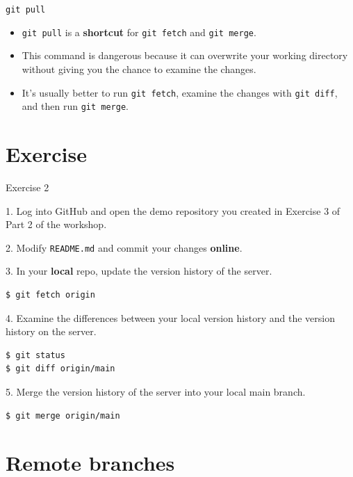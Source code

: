 \documentclass[handout]{beamer}
\begin{document}
\begin{frame}{\texttt{git pull}}
\begin{itemize}
	\item \texttt{git pull} is a \textbf{shortcut} for \texttt{git fetch} and \texttt{git merge}.
	\item This command is \alert{dangerous} because it can overwrite your working directory without giving you the chance to examine the changes. 
	\item It's usually better to run \texttt{git fetch}, examine the changes with \texttt{git diff}, and then run \texttt{git merge}.
\end{itemize}
\end{frame}

\section{Exercise}

\begin{frame}[fragile]{Exercise 2}

1. Log into GitHub and open the demo repository you created in Exercise 3 of Part 2 of the workshop. 

\vspace{0.3cm}

2. Modify \texttt{README.md} and commit your changes \textbf{online}. 

\vspace{0.3cm}

3. In your \textbf{local} repo, update the version history of the server.

\begin{lstlisting}
$ git fetch origin
\end{lstlisting}

4. Examine the differences between your local version history and the version history on the server. 

\begin{lstlisting}
$ git status
$ git diff origin/main
\end{lstlisting}

5. Merge the version history of the server into your local main branch.

\begin{lstlisting}
$ git merge origin/main
\end{lstlisting}
\end{frame}

\section{Remote branches}
\end{document}
